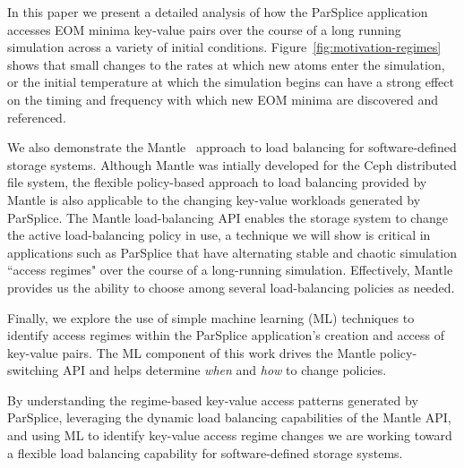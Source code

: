 In this paper we present a detailed analysis of how the ParSplice application
accesses EOM minima key-value pairs over the course of a long running simulation
across a variety of initial conditions. Figure~\ref{fig:motivation-regimes}
shows that small changes to the rates at which new atoms enter the simulation,
or the initial temperature at which the simulation begins can have a strong
effect on the timing and frequency with which new EOM minima are discovered and
referenced.

We also demonstrate the Mantle~\cite{sevilla:sc15-mantle} approach to load
balancing for software-defined storage systems.  Although Mantle was intially
developed for the Ceph distributed file system, the flexible policy-based
approach to load balancing provided by Mantle is also applicable to the
changing key-value workloads generated by ParSplice. The Mantle load-balancing
API enables the storage system to change the active load-balancing policy in
use, a technique we will show is critical in applications such as ParSplice
that have alternating stable and chaotic simulation ``access regimes" over the
course of a long-running simulation.  Effectively, Mantle provides us the
ability to choose among several load-balancing policies as needed.

Finally, we explore the use of simple machine learning (ML) techniques to
identify access regimes within the ParSplice application's creation and access
of key-value pairs. The ML component of this work drives the Mantle
policy-switching API and helps determine \emph{when} and \emph{how} to change
policies.

By understanding the regime-based key-value access patterns generated by
ParSplice, leveraging the dynamic load balancing capabilities of the Mantle
API, and using ML to identify key-value access regime changes we are working
toward a flexible load balancing capability for software-defined storage
systems. 
